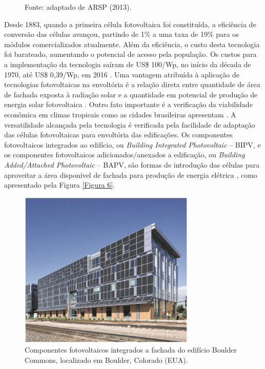 \begin{onehalfspace}
\begin{figure}[H]
        \begin{flushleft}
            \par \small Fonte: adaptado de ARSP (2013).\vspace{-0.5cm}
        \end{flushleft}
        \label{Figura 5}
    \end{figure}
\noindent Desde 1883, quando a primeira célula fotovoltaica foi constituída, a eficiência de conversão das células avançou, partindo de 1\% a uma taxa de 19\% para os módulos comercializados atualmente. Além da eficiência, o custo desta tecnologia foi barateado, aumentando o potencial de acesso pela população. Os custos para a implementação da tecnologia saíram de US\$ 100/Wp, no início da década de 1970, até US\$ 0,39/Wp, em 2016 \cite{AgenciadeServicosPublicosdeEnergiadoEstadodoEspiritoSanto-ASPE2013,Pereira2017}.\vspace{0.3cm} \newline
Uma vantagem atribuída à aplicação de tecnologias fotovoltaicas na envoltória é a relação direta entre quantidade de área de fachada exposta à radiação solar e a quantidade em potencial de produção de energia solar fotovoltaica \cite{Veloso2017}. Outro fato importante é a verificação da viabilidade econômica em climas tropicais como as cidades brasileiras apresentam \cite{Didone2014,Sorgato2018}.\vspace{0.3cm} \newline
A versatilidade alcançada pela tecnologia é verificada pela facilidade de adaptação das células fotovoltaicas para envoltória das edificações. Os componentes fotovoltaicos integrados ao edifício, ou \textit{Building Integrated Photovoltaic} – BIPV, e os componentes fotovoltaicos adicionados/anexados a edificação, ou \textit{Building Added/Attached Photovoltaic} – BAPV, são formas de introdução das células para aproveitar a área disponível de fachada para produção de energia elétrica \cite{AmericanSocietyofHeatingRefrigeratingandAir-ConditioningEngineers-ASHRAE2019}, como apresentado pela Figura \ref{Figura 6}.%
        \begin{figure}[H]
            \centering
            \caption{\small Componentes fotovoltaicos integrados a fachada do edifício Boulder Commons, localizado em Boulder, Colorado (EUA).}
            \includegraphics[width=0.75\textwidth]{figures/fig7_BIPV_ASHRAE_ZEB_2019.png}

\end{figure}
\end{onehalfspace}
